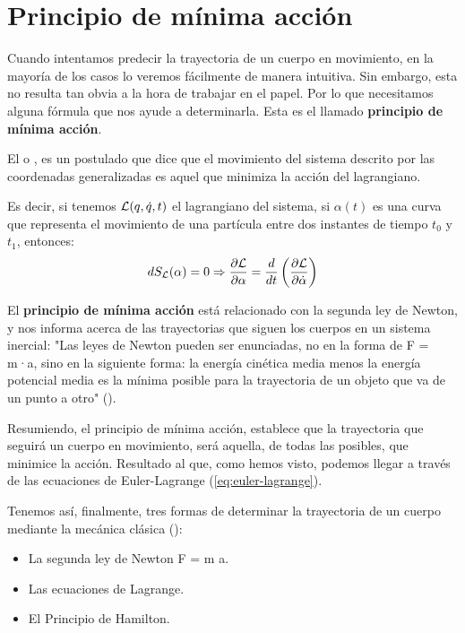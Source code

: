 \section{Principio de mínima acción}\label{sec:principio-de-minima-accion}

Cuando intentamos predecir la trayectoria de un cuerpo en movimiento, en la mayoría de los casos lo veremos fácilmente de manera intuitiva. Sin embargo, esta no resulta tan obvia a la hora de trabajar en el papel. Por lo que necesitamos alguna fórmula que nos ayude a determinarla. Esta es el llamado \textbf{principio de mínima acción}.

El  o , es un postulado que dice que el movimiento del sistema descrito por las coordenadas generalizadas es aquel que minimiza la acción del lagrangiano\label{po:pma}.

Es decir, si tenemos $\mathcal{L}(q,\dot{q}, t)$ el lagrangiano del sistema, si $\alpha(t)$ es una curva que representa el movimiento de una partícula entre dos instantes de tiempo $t_0$ y $t_1$, entonces:
\begin{equation*}
	dS_{\mathcal{L}}(\alpha)=0\Rightarrow \frac{\partial \mathcal{L}}{\partial \alpha}=\frac{d}{dt}\left( \frac{\partial \mathcal{L}}{\partial \dot{\alpha}} \right)
\end{equation*}

El \textbf{principio de mínima acción} está relacionado con la segunda ley de Newton, y nos informa acerca de las trayectorias que siguen los cuerpos en un sistema inercial:
"Las leyes de Newton pueden ser enunciadas, no en la forma de F = m·a, sino en la siguiente forma: la energía cinética media menos la energía potencial media es la mínima posible para la trayectoria de un objeto que va de un punto a otro" (\cite{Feynman}).

Resumiendo, el principio de mínima acción, establece que la trayectoria que seguirá un cuerpo en movimiento, será aquella, de todas las posibles, que minimice la acción. Resultado al que, como hemos visto, podemos llegar a través de las ecuaciones de Euler-Lagrange (\eqref{eq:euler-lagrange}).

Tenemos así, finalmente, tres formas de determinar la trayectoria de un cuerpo mediante la mecánica clásica (\cite[264]{Taylor}):
\begin{itemize}
    \item La segunda ley de Newton F = m \cdot a.
    \item Las ecuaciones de Lagrange.
    \item El Principio de Hamilton.
\end{itemize}